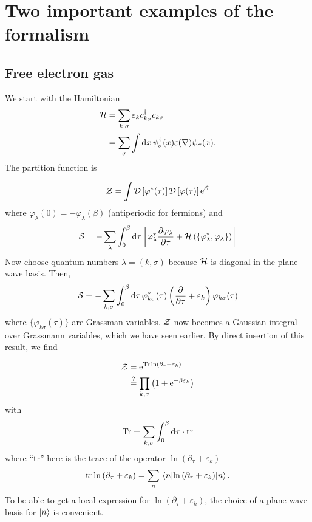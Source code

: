 \section[Examples]{Two important examples of the formalism}

\subsection{Free electron gas}
\label{sec:free_electron}

We start with the Hamiltonian
\begin{align}
\mathcal{H} &= \sum_{k,\sigma}\varepsilon_kc_{k\sigma}^\dagger c_{k\sigma}\nonumber \\
& = \sum_\sigma \int \dd{x} \psi_\sigma^\dagger(x)\varepsilon(\nabla)\psi_\sigma(x).
\end{align}
The partition function is 

\begin{equation}
\label{eq:partition_integral}
\mathcal{Z} = \int \mathcal{D}\left[\varphi^*(\tau)\right]\mathcal{D}\left[\varphi(\tau)\right]\mathrm{e}^{\mathcal{S}}
\end{equation}
where \( \varphi_\lambda(0) = -\varphi_\lambda(\beta)\) (antiperiodic for fermions) and
\begin{equation}
\mathcal{S} = -\sum_\lambda\int_0^\beta\dd{\tau}\left[\varphi_\lambda^*\pdv{\varphi_\lambda}{\tau} + \mathcal{H} \left(\{\varphi_\lambda^*, \varphi_\lambda\}\right)\right]
\end{equation}
Now choose quantum numbers \(\lambda = \left(k,\sigma\right)\) because $\mathcal{H}$ is diagonal in the plane wave basis. Then,  
\begin{equation}
\mathcal{S} = -\sum_{k,\sigma}\int_0^\beta\dd{\tau}\varphi_{k\sigma}^*(\tau)\left(\pdv{\tau} + \varepsilon_k\right)\varphi_{k\sigma}(\tau)
\end{equation}
where $\{\varphi_{k\sigma}(\tau)\}$ are Grassman variables. $\mathcal{Z}$ now becomes a Gaussian integral over Grassmann variables, which we have seen earlier. By direct insertion of this result, we find 

\begin{align}
\mathcal{Z} &= \mathrm{e}^{\Tr \ln\left(\partial_\tau + \varepsilon_k\right)} \label{eq:partition_free_electron1}\\
&\stackrel{?}{=} \prod_{k,\sigma}\left(1+\mathrm{e}^{-\beta\varepsilon_k}\right)\nonumber
\end{align} 
with 
\begin{equation}
\label{eq:trace_}
\Tr = \sum_{k,\sigma}\int_0^\beta\dd{\tau}\cdot \tr
\end{equation}
where ``tr'' here is the trace of the operator $\ln\left(\partial_\tau + \varepsilon_k\right)$
\begin{equation}
\tr\ln\left(\partial_\tau + \varepsilon_k\right) = \sum_n\ev{\ln\left(\partial_\tau + \varepsilon_k\right)}{n}.
\end{equation}
To be able to get a \underline{local} expression for $\ln\left(\partial_\tau + \varepsilon_k\right)$, the choice of a plane wave basis for $\ket n$ is convenient.

